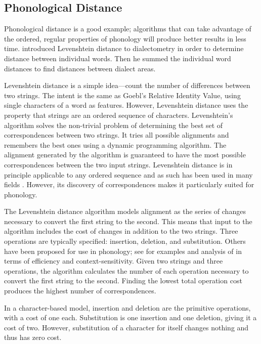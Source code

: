 \documentclass[11pt]{article}
\begin{document}
\subsection{Phonological Distance}

Phonological distance is a good example; algorithms that can take
advantage of the ordered, regular properties of phonology will produce
better results in less time.  introduced
Levenshtein distance \cite{lev65} to dialectometry in order to
determine distance between individual words. Then he summed the
individual word distances to find distances between dialect areas.

Levenshtein distance is a simple idea---count the
number of differences between two strings. The intent is the same as
Goebl's Relative Identity Value, using single characters of a word as
features. However, Levenshtein distance uses the property that strings
are an ordered sequence of characters. Levenshtein's algorithm solves
the non-trivial problem of determining the best set of correspondences
between two strings. It tries all possible alignments and
remembers the best ones using a dynamic programming algorithm. The
alignment generated by the algorithm is guaranteed to have the most
possible correspondences between the two input strings.
Levenshtein distance is in principle applicable to any
ordered sequence and as such has been used in many fields
\cite{sankoff83}. However, its discovery of correspondences makes it
particularly suited for phonology.

The Levenshtein distance algorithm models alignment as the series of
changes necessary to convert the first string to the second. This
means that input to the algorithm includes the cost of changes in
addition to the two strings. Three operations are typically
specified: insertion, deletion, and substitution. Others have been
proposed for use in phonology; see \cite{kondrak02} for examples and
analysis of in terms of efficiency and context-sensitivity. Given two
strings and three operations, the algorithm calculates the number of
each operation necessary to convert the first string to the
second. Finding the lowest total operation cost produces the highest
number of correspondences.

In a character-based model, insertion and deletion are the primitive operations,
with a cost of one each. Substitution is one insertion and one
deletion, giving it a cost of two. However, substitution of a character
for itself changes nothing and thus has zero cost.
\end{document}
